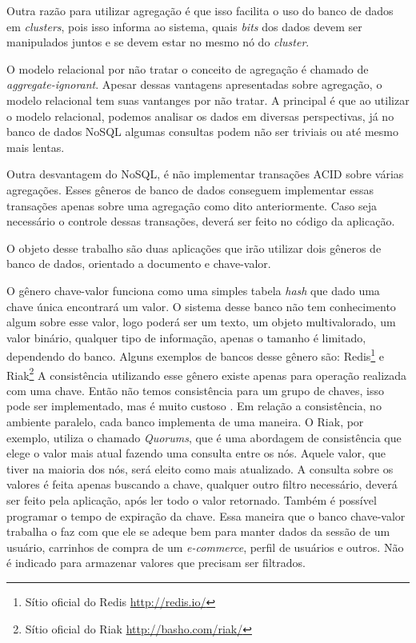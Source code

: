Outra razão para utilizar agregação é que isso facilita o uso do banco de dados em \textit{clusters}, pois isso informa ao sistema, quais \textit{bits} dos dados devem ser manipulados juntos e se devem estar no mesmo nó do \textit{cluster}.

O modelo relacional por não tratar o conceito de agregação é chamado de \textit{aggregate-ignorant}. Apesar dessas vantagens apresentadas sobre agregação, o modelo relacional tem suas vantanges por não tratar. A principal é que ao utilizar o modelo relacional, podemos analisar os dados em diversas perspectivas, já no banco de dados NoSQL algumas consultas podem não ser triviais ou até mesmo mais lentas.

Outra desvantagem do NoSQL, é não implementar transações \ac{ACID} sobre várias agregações. Esses gêneros de banco de dados conseguem implementar essas transações apenas sobre uma agregação como dito anteriormente. Caso seja necessário o controle dessas transações, deverá ser feito no código da aplicação.

O objeto desse trabalho são duas aplicações que irão utilizar dois gêneros de banco de dados, orientado a documento e chave-valor.

O gênero chave-valor funciona como uma simples tabela \textit{hash} que dado uma chave única encontrará um valor. O sistema desse banco não tem conhecimento algum sobre esse valor, logo poderá ser um texto, um objeto multivalorado, um valor binário, qualquer tipo de informação, apenas o tamanho é limitado, dependendo do banco. Alguns exemplos de bancos desse gênero são: \ac{Redis}\footnote{Sítio oficial do Redis \url{http://redis.io/}} e Riak\footnote{Sítio oficial do Riak \url{http://basho.com/riak/}}
A consistência utilizando esse gênero existe apenas para operação realizada com uma chave. Então não temos consistência para um grupo de chaves, isso pode ser implementado, mas é muito custoso \cite{NoSQL}. Em relação a consistência, no ambiente paralelo, cada banco implementa de uma maneira. O Riak, por exemplo, utiliza o chamado \textit{Quorums}, que é uma abordagem de consistência que elege o valor mais atual fazendo uma consulta entre os nós. Aquele valor, que tiver na maioria dos nós, será eleito como mais atualizado.
A consulta sobre os valores é feita apenas buscando a chave, qualquer outro filtro necessário, deverá ser feito pela aplicação, após ler todo o valor retornado. Também é possível programar o tempo de expiração da chave. Essa maneira que o banco chave-valor trabalha o faz com que ele se adeque bem para manter dados da sessão de um usuário, carrinhos de compra de um \textit{e-commerce}, perfil de usuários e outros. Não é indicado para armazenar valores que precisam ser filtrados.

